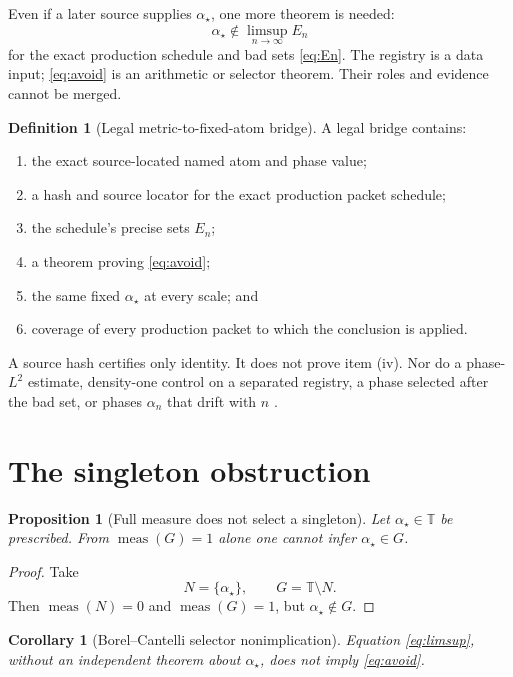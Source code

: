 \documentclass[11pt]{article}
\newtheorem{proposition}[theorem]{Proposition}
\newtheorem{corollary}[theorem]{Corollary}
\theoremstyle{definition}
\newtheorem{definition}[theorem]{Definition}
\theoremstyle{remark}
\newcommand{\T}{\mathbb T}
\begin{document}
Even if a later source supplies \(\alpha_\star\), one more theorem is
needed:
\[
 \boxed{\alpha_\star\notin\limsup_{n\to\infty}E_n}
\tag{10}\label{eq:avoid}
\]
for the exact production schedule and bad sets \eqref{eq:En}.  The
registry is a data input; \eqref{eq:avoid} is an arithmetic or
selector theorem.  Their roles and evidence cannot be merged.

\begin{definition}[Legal metric-to-fixed-atom bridge]
\label{def:bridge}
A legal bridge contains:
\begin{enumerate}[label=(\roman*),leftmargin=2.2em]
\item the exact source-located named atom and phase value;
\item a hash and source locator for the exact production packet
  schedule;
\item the schedule's precise sets \(E_n\);
\item a theorem proving \eqref{eq:avoid};
\item the same fixed \(\alpha_\star\) at every scale; and
\item coverage of every production packet to which the conclusion is
  applied.
\end{enumerate}
\end{definition}

A source hash certifies only identity.  It does not prove item (iv).
Nor do a phase-\(L^2\) estimate, density-one control on a separated
registry, a phase selected after the bad set, or phases
\(\alpha_n\) that drift with \(n\)
\citep{WangTPC167,WangTPC168,WangTPC171,WangTPC172}.

\section{The singleton obstruction}

\begin{proposition}[Full measure does not select a singleton]
\label{prop:singleton}
Let \(\alpha_\star\in\T\) be prescribed.  From
\(\operatorname{meas}(G)=1\) alone one cannot infer
\(\alpha_\star\in G\).
\end{proposition}

\begin{proof}
Take
\[
 N=\{\alpha_\star\},\qquad G=\T\setminus N.
\]
Then \(\operatorname{meas}(N)=0\) and
\(\operatorname{meas}(G)=1\), but
\(\alpha_\star\notin G\).
\end{proof}

\begin{corollary}[Borel--Cantelli selector nonimplication]
\label{cor:BC}
Equation \eqref{eq:limsup}, without an independent theorem about
\(\alpha_\star\), does not imply \eqref{eq:avoid}.
\end{corollary}
\end{document}
